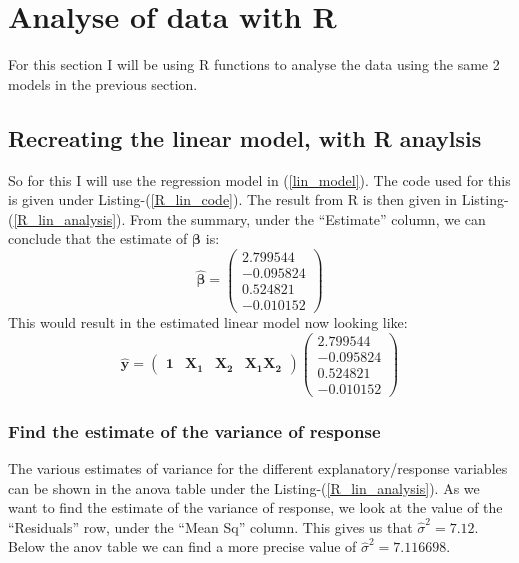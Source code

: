 \documentclass[12pt]{article}
\newcommand{\vect}[1]{\boldsymbol{#1}}
\newcommand{\est}[1]{\hat{#1}}
\begin{document}
\newpage
\section{Analyse of data with R}
For this section I will be using R functions to analyse the data using the same 2 models in the previous section.


\subsection{Recreating the linear model, with R anaylsis}
So for this I will use the regression model in (\ref{lin_model}). The code used for this is given under Listing-(\ref{R_lin_code}). The result from R is then given in Listing-(\ref{R_lin_analysis}). From the summary, under the \enquote{Estimate} column, we can conclude that the estimate of $\vect{\beta}$ is:
\begin{equation} \label{R_lin_beta}
  \est{\vect{\beta}} =
  \begin{pmatrix}
       2.799544 \\
      -0.095824 \\
       0.524821 \\
      -0.010152
  \end{pmatrix}
\end{equation}
This would result in the estimated linear model now looking like:
\begin{equation*}
\est{\vect{y}} = \begin{pmatrix}
                    \vect{1} & \vect{X_1} & \vect{X_2} & \vect{X_1}\vect{X_2}
                 \end{pmatrix}
                 \begin{pmatrix}
                     2.799544 \\
                    -0.095824 \\
                     0.524821 \\
                    -0.010152
                 \end{pmatrix}
\end{equation*}


\subsubsection{Find the estimate of the variance of response}
The various estimates of variance for the different explanatory/response variables can be shown in the anova table under the Listing-(\ref{R_lin_analysis}). As we want to find the estimate of the variance of response, we look at the value of the \enquote{Residuals} row, under the \enquote{Mean Sq} column. This gives us that $\est{\sigma}^2 = 7.12$. Below the anov table we can find a more precise value of $\est{\sigma}^2 = 7.116698$.
\end{document}
